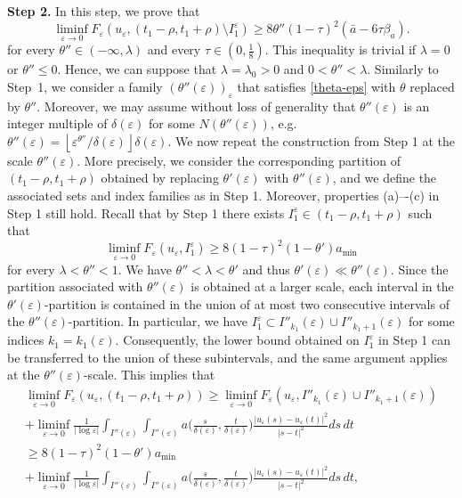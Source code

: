 \documentclass[12pt]{article}
\numberwithin{equation}{section}
\def\e{\varepsilon}
\begin{document}
\medskip
\noindent \textbf{Step 2.}  In this step, we prove that 
  \begin{equation}\label{second-lb}    \liminf_{\varepsilon\to0}F_{\varepsilon}(u_{\varepsilon},(t_{1}-\rho,t_{1}+\rho)\setminus I^\e_1)\ge 8\theta''(1-\tau)^{2}(\bar{a}-6\tau\beta_a).
 \end{equation}
 for every $\theta''\in(-\infty,\lambda)$ and every $\tau\in(0,\frac{1}{8})$.
 This inequality is trivial if $\lambda=0$ or $\theta''\le 0$. Hence, we can suppose that $\lambda=
\lambda_0>0$ and $0<\theta''<\lambda$. Similarly to Step~1, we consider a family $(\theta''(\e))_{\e}$ that satisfies \eqref{theta-eps} with $\theta$ replaced by $\theta''$. Moreover, we may assume without loss of generality that $\theta''(\varepsilon)$ is an integer multiple of $\delta(\varepsilon)$ for some $N(\theta''(\e))$, e.g. $\theta''(\varepsilon) = \left\lfloor \varepsilon^{\theta''}/{\delta(\varepsilon)} \right\rfloor \delta(\varepsilon)$. We now repeat the construction from Step 1 at the scale $\theta''(\varepsilon)$. More precisely, we consider the corresponding partition of $(t_1-\rho,t_1+\rho)$ obtained by replacing $\theta'(\varepsilon)$ with $\theta''(\varepsilon)$, and we define the associated sets and index families as in Step 1. Moreover, properties (a)–-(c) in Step 1 still hold. Recall that by Step 1 there exists $I^{\e}_{1}\in(t_{1}-\rho,t_{1}+\rho)$ such that
 \begin{equation*}
\liminf_{\varepsilon\to0}F_{\varepsilon}(u_{\varepsilon},I^{\e}_{1})\ge8(1-\tau)^{2}(1-\theta')a_{\min}
 \end{equation*}
 for every $\lambda<\theta''<1$. We have $\theta''<\lambda<\theta'$ and thus $\theta'(\e)\ll\theta''(\e)$. Since the partition associated with $\theta''(\e)$ is obtained at a larger scale, each interval in the $\theta'(\e)$-partition is contained in the union of at most two consecutive intervals of the $\theta''(\e)$-partition. In particular, %
we have
$I^\e_{1} \subset I''_{k_1}(\e)\cup I''_{k_{1}+1}(\e)$
for some indices $k_{1}=k_{1}(\e)$. Consequently, the lower bound obtained on $I^\e_{1}$ in Step 1 can be transferred to the union of these subintervals, and the same argument applies at the $\theta''(\e)$-scale. This implies that
 \begin{multline*}
     \liminf_{\e\to0}F_{\e}(u_{\e},(t_1-\rho,t_1+\rho))\ge \liminf_{\e\to0}F_{\e}(u_{\e},I''_{k_1}(\e)\cup I''_{k_{1}+1}(\e))\\+\liminf_{\e\to0}\frac{1}{\left|\log{\e}\right|}\int_{I''(\varepsilon)}\int_{I''(\e)}a\big(\frac{s}{\delta(\e) },\frac{t}{\delta(\e) }\big)\frac{\left|u_{\e}(s)-u_{\e}(t)\right|^2}{\left|s-t\right|^2}ds\,dt\\\ge8(1-\tau)^{2}(1-\theta')a_{\min}
     \\+\liminf_{\e\to0}\frac{1}{\left|\log{\e}\right|}\int_{I''(\varepsilon)}\int_{I''(\e)}a\big(\frac{s}{\delta(\e) },\frac{t}{\delta(\e) }\big)\frac{\left|u_{\e}(s)-u_{\e}(t)\right|^2}{\left|s-t\right|^2}ds\,dt,
 \end{multline*}
\end{document}
